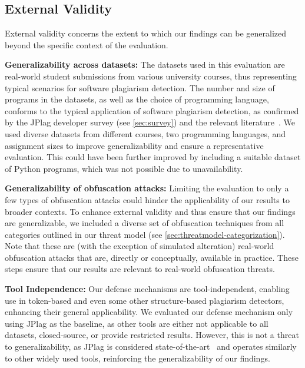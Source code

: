 \subsection{External Validity}
External validity concerns the extent to which our findings can be generalized beyond the specific context of the evaluation. %

    \textbf{Generalizability across datasets:} The datasets used in this evaluation are real-world student submissions from various university courses, thus representing typical scenarios for software plagiarism detection.
    The number and size of programs in the datasets, as well as the choice of programming language, conforms to the typical application of software plagiarism detection, as confirmed by the JPlag developer survey (see \autoref{sec:survey}) and the relevant literature~\cite{Novak2019}.
    We used diverse datasets from different courses, two programming languages, and assignment sizes to improve generalizability and ensure a representative evaluation. This could have been further improved by including a suitable dataset of Python programs, which was not possible due to unavailability. 

    \textbf{Generalizability of obfuscation attacks:}
    Limiting the evaluation to only a few types of obfuscation attacks could hinder the applicability of our results to broader contexts. To enhance external validity and thus ensure that our findings are generalizable, we included a diverse set of obfuscation techniques from all categories outlined in our threat model (see \autoref{sec:threatmodel-categorization}). Note that these are (with the exception of simulated alteration) real-world obfuscation attacks that are, directly or conceptually, available in practice. These steps ensure that our results are relevant to real-world obfuscation threats.

    \textbf{Tool Independence:} Our defense mechanisms are tool-independent, enabling use in token-based and even some other structure-based plagiarism detectors, enhancing their general applicability.
    We evaluated our defense mechanism only using JPlag as the baseline, as other tools are either not applicable to all datasets, closed-source, or provide restricted results. However, this is not a threat to generalizability, as JPlag is considered state-of-the-art~\cite{Novak2019, Aniceto2021} and operates similarly to other widely used tools, reinforcing the generalizability of our findings.

